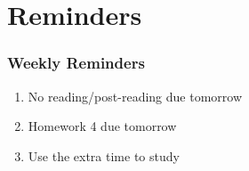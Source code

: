 \documentclass{beamer}
\begin{document}
\section{Reminders}
%
%
\begin{frame}
  \frametitle{Weekly Reminders}
  \begin{enumerate}[A]
    \item No reading/post-reading due tomorrow
    \item Homework 4 due tomorrow
    \item Use the extra time to study
  \end{enumerate}
\end{frame}
\end{document}

